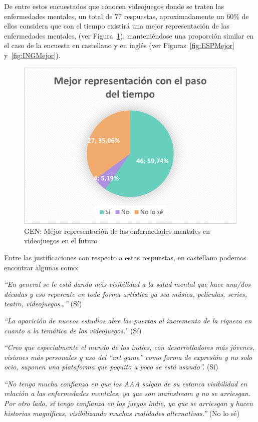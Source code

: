 \documentclass[12pt, a4paper,twoside,titlepage]{book}
\begin{document}
De entre estos encuestados que conocen videojuegos donde se traten las enfermedades mentales, un total de 77 respuestas, aproximadamente un 60\% de ellos considera que con el tiempo existirá una mejor representación de las enfermedades mentales, (ver Figura~\ref{fig:Mejor}), manteniéndose una proporción similar en el caso de la encuesta en castellano y en inglés (ver Figuras~\ref{fig:ESPMejor} y~\ref{fig:INGMejor}). 

\begin{figure}
\centering
 \includegraphics[width=.8\linewidth]{Imagenes Form GEN/12GENMejor}
 \caption{GEN: Mejor representación de las enfermedades mentales en videojuegos en el futuro}
 \label{fig:Mejor}
 \end{figure}

Entre las justificaciones con respecto a estas respuestas, en castellano podemos encontrar algunas como: 

\textit{``En general se le está dando más visibilidad a la salud mental que hace una/dos décadas y eso repercute en toda forma artística ya sea música, películas, series, teatro, videojuegos…''} (Sí)

\textit{``La aparición de nuevos estudios abre las puertas al incremento de la riqueza en cuanto a la temática de los videojuegos.''} (Sí)

\textit{``Creo que especialmente el mundo de los indies, con desarrolladores más jóvenes, visiones más personales y uso del ``art game'' como forma de expresión y no solo ocio, suponen una plataforma que poquito a poco se está usando''.} (Sí)

\textit{``No tengo mucha confianza en que los AAA salgan de su estanca visibilidad en relación a las enfermedades mentales, ya que son mainstream y no se arriesgan. Por otro lado, sí tengo confianza en los juegos indie, ya que se arriesgan y hacen historias magníficas, visibilizando muchas realidades alternativas.''} (No lo sé) 
\end{document}
